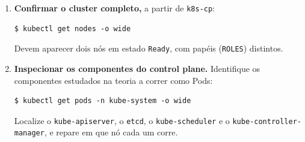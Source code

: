\documentclass[11pt,a4paper]{article}
\begin{document}
\begin{enumerate}[label=\arabic*.,resume]
  \item \textbf{Confirmar o cluster completo,} a partir de \texttt{k8s-cp}:
\begin{lstlisting}
$ kubectl get nodes -o wide
\end{lstlisting}
  Devem aparecer dois nós em estado \texttt{Ready}, com papéis (\texttt{ROLES}) distintos.

  \item \textbf{Inspecionar os componentes do control plane.} Identifique os componentes estudados na teoria a correr como Pods:
\begin{lstlisting}
$ kubectl get pods -n kube-system -o wide
\end{lstlisting}
  Localize o \texttt{kube-apiserver}, o \texttt{etcd}, o \texttt{kube-scheduler} e o \texttt{kube-controller-manager}, e repare em que nó cada um corre.

\end{enumerate}
\end{document}
